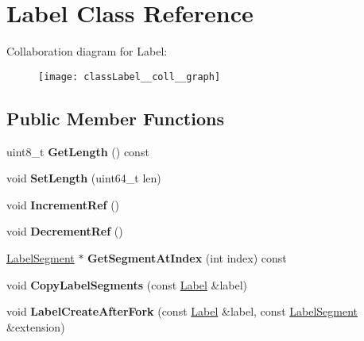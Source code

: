\hypertarget{classLabel}{\section{Label Class Reference}
\label{classLabel}
}


Collaboration diagram for Label\-:
\nopagebreak
\begin{figure}[H]
\begin{center}
\leavevmode
\texttt{[image: classLabel\_\_coll\_\_graph]}
\end{center}
\end{figure}
\subsection*{Public Member Functions}
\begin{DoxyCompactItemize}
\item 
\hypertarget{classLabel_a3d24d0fa7b7143b026bd23997a06c296}{uint8\-\_\-t {\bfseries Get\-Length} () const }\label{classLabel_a3d24d0fa7b7143b026bd23997a06c296}

\item 
\hypertarget{classLabel_a475dc352b81f8b64683d54ff3fe8d5be}{void {\bfseries Set\-Length} (uint64\-\_\-t len)}\label{classLabel_a475dc352b81f8b64683d54ff3fe8d5be}

\item 
\hypertarget{classLabel_a50e658323137aefd599f0bc7f8d6fd6e}{void {\bfseries Increment\-Ref} ()}\label{classLabel_a50e658323137aefd599f0bc7f8d6fd6e}

\item 
\hypertarget{classLabel_a9e5b99342ddd639decfc651e5244b401}{void {\bfseries Decrement\-Ref} ()}\label{classLabel_a9e5b99342ddd639decfc651e5244b401}

\item 
\hypertarget{classLabel_af736ace059589eeee09cd026ed971cdf}{\hyperlink{structLabelSegment}{Label\-Segment} $\ast$ {\bfseries Get\-Segment\-At\-Index} (int index) const }\label{classLabel_af736ace059589eeee09cd026ed971cdf}

\item 
\hypertarget{classLabel_ad955a0f57fd172dbd14f0303e4501aa9}{void {\bfseries Copy\-Label\-Segments} (const \hyperlink{classLabel}{Label} \&label)}\label{classLabel_ad955a0f57fd172dbd14f0303e4501aa9}

\item 
\hypertarget{classLabel_a9499c1f80b21413facd34e17d0d40f25}{void {\bfseries Label\-Create\-After\-Fork} (const \hyperlink{classLabel}{Label} \&label, const \hyperlink{structLabelSegment}{Label\-Segment} \&extension)}\label{classLabel_a9499c1f80b21413facd34e17d0d40f25}


\end{DoxyCompactItemize}
